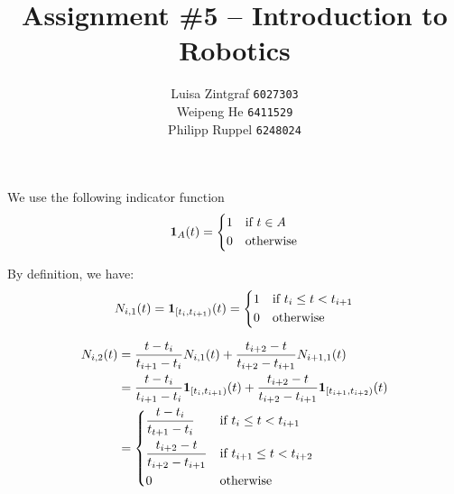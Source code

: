 \documentclass[a4paper,11pt]{article}
\title{Assignment \#5 -- Introduction to Robotics}
\author{
Luisa Zintgraf \texttt{6027303} \\
Weipeng He \texttt{6411529} \\
Philipp Ruppel \texttt{6248024}
}
\begin{document}
\maketitle

\section{} %

\section{} %
We use the following indicator function
\[
  \mathbf{1}_A(t) = \begin{dcases}
      1 & \text{if } t \in A \\
      0 & \text{otherwise}
    \end{dcases}
\]

By definition, we have:
\[
  N_{i,1}(t) = \mathbf{1}_{[t_{i}, t_{i+1})}(t) = \begin{dcases}
      1 & \text{if } t_{i} \leq t < t_{i+1} \\
      0 & \text{otherwise}
    \end{dcases}
\]

\begin{align*}
  N_{i,2}(t) &= \frac{t-t_{i}}{t_{i+1}-t_{i}} N_{i,1}(t) + \frac{t_{i+2}-t}{t_{i+2}-t_{i+1}} N_{i+1,1}(t) \\
             &= \frac{t-t_{i}}{t_{i+1}-t_{i}} \mathbf{1}_{[t_{i}, t_{i+1})}(t) + \frac{t_{i+2}-t}{t_{i+2}-t_{i+1}} \mathbf{1}_{[t_{i+1}, t_{i+2})}(t) \\
             &= 
  \begin{dcases}
    \frac{t-t_{i}}{t_{t+1}-t_{i}} & \text{if } t_{i} \leq t < t_{i+1} \\
    \frac{t_{i+2}-t}{t_{i+2}-t_{i+1}} & \text{if } t_{i+1} \leq t < t_{i+2} \\
    0 & \text{otherwise}
  \end{dcases}
\end{align*}
\end{document}
